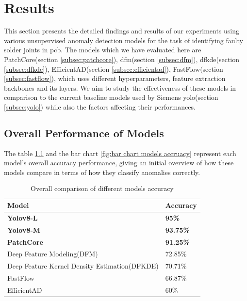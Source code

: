 \chapter{Results}

This section presents the detailed findings and results of our experiments using various unsupervised anomaly detection models for the task of identifying faulty solder joints in \gls{pcb}. The models which we have evaluated here are PatchCore(section \ref{subsec:patchcore}), \gls{dfm}(section \ref{subsec:dfm}), \gls{dfkde}(section \ref{subsec:dfkde}), EfficientAD(section \ref{subsec:efficientad}), FastFlow(section \ref{subsec:fastflow}), which uses different hyperparameters, feature extraction backbones and its layers. We aim to study the effectiveness of these models in comparison to the current baseline models used by Siemens \gls{yolo}(section \ref{subsec:yolo}) while also the factors affecting their performances.

\section{Overall Performance of Models}

The table \ref{tab:overall model accuracy} and the bar chart \ref{fig:bar chart models accruacy} represent each model's overall accuracy performance, giving an initial overview of how these models compare in terms of how they classify anomalies correctly.

\begin{table}[ht!]
    \centering
    \begin{tabular}{|l|l|}
        \hline
        \textbf{Model} & \textbf{Accuracy} \\ \hline
        \textbf{Yolov8-L} & \textbf{95\%} \\ \hline
        \textbf{Yolov8-M} & \textbf{93.75\%} \\ \hline
        \textbf{PatchCore} & \textbf{91.25\%} \\ \hline
        Deep Feature Modeling(DFM) & 72.85\% \\ \hline
        Deep Feature Kernel Density Estimation(DFKDE) & 70.71\% \\ \hline
        FastFlow & 66.87\% \\ \hline
        EfficientAD & 60\% \\ \hline
    \end{tabular}
    \caption{Overall comparison of different models accuracy}
    \label{tab:overall model accuracy}
\end{table}

